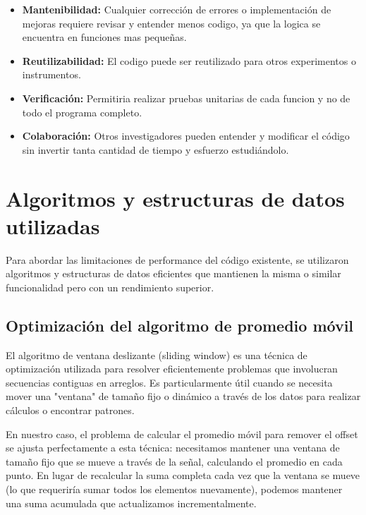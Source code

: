 \documentclass[12pt,a4paper]{article}
\begin{document}
\begin{itemize}

\item \textbf{Mantenibilidad:} Cualquier corrección de errores o implementación de mejoras requiere revisar y entender menos codigo, ya que la logica se encuentra en funciones mas pequeñas.

\item \textbf{Reutilizabilidad:} El codigo puede ser reutilizado para otros experimentos o instrumentos.

\item \textbf{Verificación:} Permitiria realizar pruebas unitarias de cada funcion y no de todo el programa completo.

\item \textbf{Colaboración:} Otros investigadores pueden entender y modificar el código sin
invertir tanta cantidad de tiempo y esfuerzo estudiándolo.

\end{itemize}


\section{Algoritmos y estructuras de datos utilizadas}
\lhead{}

Para abordar las limitaciones de performance del código existente, se utilizaron algoritmos y estructuras de datos eficientes que mantienen la misma o similar funcionalidad pero con un rendimiento superior.

\subsection{Optimización del algoritmo de promedio móvil}

El algoritmo de ventana deslizante (sliding window) es una técnica de optimización utilizada para resolver eficientemente problemas que involucran secuencias contiguas en arreglos. Es particularmente útil cuando se necesita mover una "ventana" de tamaño fijo o dinámico a través de los datos para realizar cálculos o encontrar patrones.

En nuestro caso, el problema de calcular el promedio móvil para remover el offset se ajusta perfectamente a esta técnica: necesitamos mantener una ventana de tamaño fijo que se mueve a través de la señal, calculando el promedio en cada punto. En lugar de recalcular la suma completa cada vez que la ventana se mueve (lo que requeriría sumar todos los elementos nuevamente), podemos mantener una suma acumulada que actualizamos incrementalmente.
\end{document}
